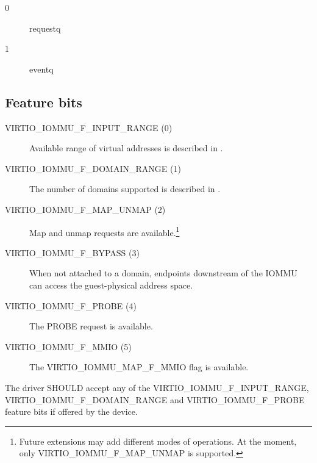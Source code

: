 \begin{description}
\item[0] requestq
\item[1] eventq
\end{description}

\subsection{Feature bits}\label{sec:Device Types / IOMMU Device / Feature bits}

\begin{description}
\item[VIRTIO_IOMMU_F_INPUT_RANGE (0)]
  Available range of virtual addresses is described in
    .

\item[VIRTIO_IOMMU_F_DOMAIN_RANGE (1)]
  The number of domains supported is described in .

\item[VIRTIO_IOMMU_F_MAP_UNMAP (2)]
  Map and unmap requests are available.\footnote{Future extensions may add
  different modes of operations. At the moment, only
  VIRTIO_IOMMU_F_MAP_UNMAP is supported.}

\item[VIRTIO_IOMMU_F_BYPASS (3)]
  When not attached to a domain, endpoints downstream of the IOMMU
  can access the guest-physical address space.

\item[VIRTIO_IOMMU_F_PROBE (4)]
  The PROBE request is available.

\item[VIRTIO_IOMMU_F_MMIO (5)]
  The VIRTIO_IOMMU_MAP_F_MMIO flag is available.
\end{description}


The driver SHOULD accept any of the VIRTIO_IOMMU_F_INPUT_RANGE,
VIRTIO_IOMMU_F_DOMAIN_RANGE and VIRTIO_IOMMU_F_PROBE feature bits if
offered by the device.


